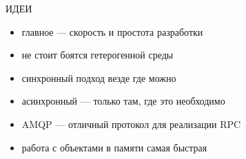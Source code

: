 \documentclass[aspectratio=169]{beamer}
\begin{document}
{
\begin{frame}[plain]{}
\end{frame}
}

\begin{frame}{ИДЕИ}
    \begin{itemize}
        \item главное --- скорость и простота разработки
        \item не стоит боятся гетерогенной среды
        \item синхронный подход везде где можно
        \item асинхронный --- только там, где это необходимо
        \item AMQP --- отличный протокол для реализации RPC
        \item работа с объектами в памяти самая быстрая
    \end{itemize}
\end{frame}
\end{document}
